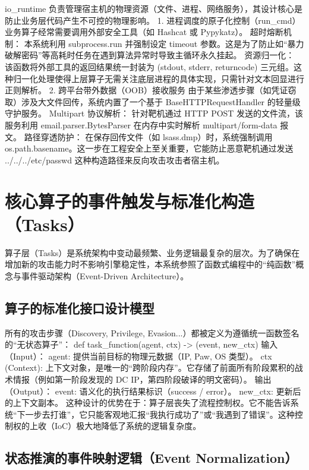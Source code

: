 \documentclass[twoside,openright]{xduugthesis}
\begin{document}
io_runtime 负责管理宿主机的物理资源（文件、进程、网络服务），其设计核心是防止业务层代码产生不可控的物理影响。
1. 进程调度的原子化控制（run_cmd） 业务算子经常需要调用外部安全工具（如 Hashcat 或 Pypykatz）。
超时熔断机制： 本系统利用 subprocess.run 并强制设定 timeout 参数。这是为了防止如“暴力破解密码”等高耗时任务在遇到算法异常时导致主循环永久挂起。
资源归一化： 该函数将外部工具的返回结果统一封装为 (stdout, stderr, returncode) 三元组。这种归一化处理使得上层算子无需关注底层进程的具体实现，只需针对文本回显进行正则解析。
2. 跨平台带外数据（OOB）接收服务 由于某些渗透步骤（如凭证窃取）涉及大文件回传，系统内置了一个基于 BaseHTTPRequestHandler 的轻量级守护服务。
Multipart 协议解析： 针对靶机通过 HTTP POST 发送的文件流，该服务利用 email.parser.BytesParser 在内存中实时解析 multipart/form-data 报文。
路径穿透防护： 在保存回传文件（如 lsass.dmp）时，系统强制调用 os.path.basename。这一步在工程安全上至关重要，它能防止恶意靶机通过发送 ../../../etc/passwd 这种构造路径来反向攻击攻击者宿主机。


\section{核心算子的事件触发与标准化构造（Tasks）}

算子层（Tasks）是系统架构中变动最频繁、业务逻辑最复杂的层次。为了确保在增加新的攻击能力时不影响引擎稳定性，本系统参照了函数式编程中的“纯函数”概念与事件驱动架构（Event-Driven Architecture）。

\subsection{算子的标准化接口设计模型}

所有的攻击步骤（Discovery, Privilege, Evasion...）都被定义为遵循统一函数签名的“无状态算子”： def task_function(agent, ctx) -> (event, new_ctx)
输入（Input）：
agent: 提供当前目标的物理元数据（IP, Paw, OS 类型）。
ctx (Context): 上下文对象，是唯一的“跨阶段内存”。它存储了前面所有阶段累积的战术情报（例如第一阶段发现的 DC IP，第四阶段破译的明文密码）。
输出（Output）：
event: 语义化的执行结果标识（success / error）。
new_ctx: 更新后的上下文副本。
这种设计的优势在于：算子层丧失了流程控制权。它不能告诉系统“下一步去打谁”，它只能客观地汇报“我执行成功了”或“我遇到了错误”。这种控制权的上收（IoC）极大地降低了系统的逻辑复杂度。

\subsection{状态推演的事件映射逻辑（Event Normalization）}
\end{document}
